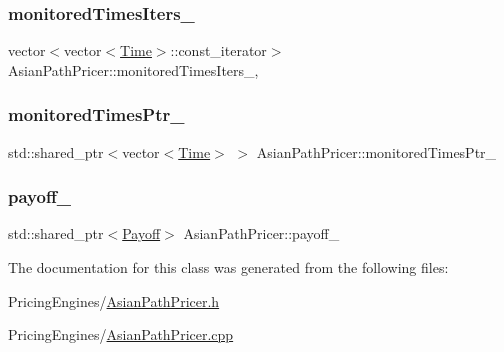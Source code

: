 \subsubsection{\texorpdfstring{monitored\+Times\+Iters\+\_\+}{monitoredTimesIters\_}}
{\footnotesize\ttfamily vector$<$vector$<$\hyperlink{_name_def_8h_ac2d3e0ba793497bcca555c7c2cf64ff3}{Time}$>$\+::const\+\_\+iterator$>$ Asian\+Path\+Pricer\+::monitored\+Times\+Iters\+\_\+\hspace{0.3cm}{\ttfamily [mutable]}, {\ttfamily [private]}}

\hypertarget{class_asian_path_pricer_aa774ae5f2659aee3a7b5e40b3089c3be}{}\label{class_asian_path_pricer_aa774ae5f2659aee3a7b5e40b3089c3be} 
\subsubsection{\texorpdfstring{monitored\+Times\+Ptr\+\_\+}{monitoredTimesPtr\_}}
{\footnotesize\ttfamily std\+::shared\+\_\+ptr$<$vector$<$\hyperlink{_name_def_8h_ac2d3e0ba793497bcca555c7c2cf64ff3}{Time}$>$ $>$ Asian\+Path\+Pricer\+::monitored\+Times\+Ptr\+\_\+\hspace{0.3cm}{\ttfamily [private]}}

\hypertarget{class_asian_path_pricer_a21540fed13894f9f62828d9817de8f5f}{}\label{class_asian_path_pricer_a21540fed13894f9f62828d9817de8f5f} 
\subsubsection{\texorpdfstring{payoff\+\_\+}{payoff\_}}
{\footnotesize\ttfamily std\+::shared\+\_\+ptr$<$\hyperlink{class_payoff}{Payoff}$>$ Asian\+Path\+Pricer\+::payoff\+\_\+\hspace{0.3cm}{\ttfamily [private]}}



The documentation for this class was generated from the following files\+:\begin{DoxyCompactItemize}
\item 
Pricing\+Engines/\hyperlink{_asian_path_pricer_8h}{Asian\+Path\+Pricer.\+h}\item 
Pricing\+Engines/\hyperlink{_asian_path_pricer_8cpp}{Asian\+Path\+Pricer.\+cpp}\end{DoxyCompactItemize}
